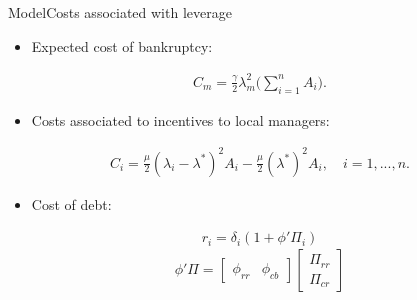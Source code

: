 \documentclass{beamer}
\begin{document}
\begin{frame}{Model}{Costs associated with leverage}
\begin{itemize}
	\item  Expected cost of bankruptcy:
\end{itemize}
\begin{equation}
\begin{aligned}
C_m=\frac{\gamma}{2}\lambda_m^2\bigg(\sum_{i=1}^{n}A_i\bigg).
\end{aligned}
\label{eq:cost bankruptcy}
\end{equation}
\begin{itemize}
\item  Costs associated to incentives to local managers:
\end{itemize}
\begin{equation}
\begin{aligned}
C_i=\frac{\mu}{2}(\lambda_i-\lambda^*)^2A_i-\frac{\mu}{2}(\lambda^*)^2A_i, \quad i=1,...,n.
\end{aligned}
\label{eq:agency cost}
\end{equation}
\begin{itemize}
	\item  Cost of debt:
\end{itemize}
\begin{equation}
\begin{aligned}
r_i=\delta_i(1+\phi'\Pi_i)
\end{aligned}
\label{eq:cost of debt}
\end{equation}
\begin{equation}
\phi'\Pi=\begin{bmatrix}
\phi_{rr} &  \phi_{cb}
\end{bmatrix}
\begin{bmatrix}
\Pi_{rr} \\   
\Pi_{cr} 
\end{bmatrix}
\label{eq:phi vector}
\end{equation}
\end{frame}
\end{document}
